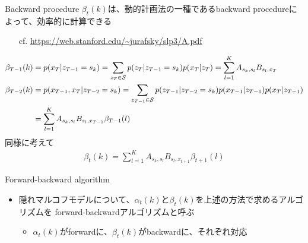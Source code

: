 \documentclass[aspectratio=169,unicode,dvipdfmx,14pt]{beamer}
\begin{document}
\begin{frame}{Backward procedure}
\FontMath
$\beta_t(k)$は、動的計画法の一種であるbackward procedureによって、効率的に計算できる
\begin{itemize}
\item[cf.] \href{https://web.stanford.edu/~jurafsky/slp3/A.pdf}{https://web.stanford.edu/\~{}jurafsky/slp3/A.pdf}
\end{itemize}
\begin{align}
\beta_{T-1}(k) & = p(x_T|z_{T-1}=s_k) = \sum_{z_T \in \mathcal{S}} p(z_T|z_{T-1}=s_k)p(x_T|z_T)
= \sum_{l=1}^K A_{s_k, s_l} B_{s_l, x_T}
\\
\beta_{T-2}(k) & = p(x_{T-1},x_T|z_{T-2}=s_k)
= \sum_{z_{T-1} \in \mathcal{S}} p(z_{T-1}|z_{T-2}=s_k)p(x_{T-1}|z_{T-1})p(x_T|z_{T-1})
\notag \\ &
= \sum_{l=1}^K A_{s_k, s_l} B_{s_l,x_{T-1}} \beta_{T-1}(l)
\end{align}
同様に考えて
\begin{align}
\beta_t(k) = \sum_{l=1}^K A_{s_k, s_l} B_{s_l, x_{t+1}} \beta_{t+1}(l)
\end{align}
\end{frame}

\begin{frame}{Forward-backward algorithm}
\begin{itemize}
\item 隠れマルコフモデルについて、$\alpha_t(k)$と$\beta_t(k)$を上述の方法で求めるアルゴリズムを
forward-backwardアルゴリズムと呼ぶ
\begin{itemize}
\item $\alpha_t(k)$がforwardに、$\beta_t(k)$がbackwardに、それぞれ対応
\end{itemize}
\end{itemize}
\end{frame}
\end{document}
